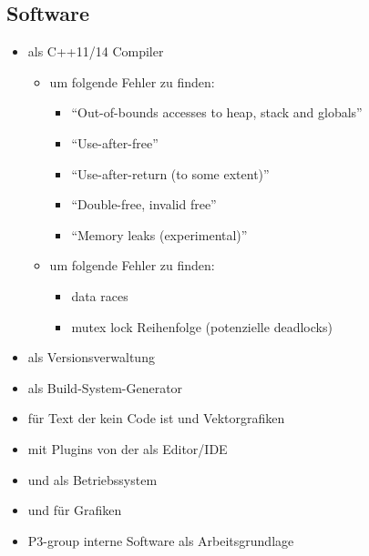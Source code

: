   \subsection{Software}
  \label{ssec:software}
    \begin{itemize}
      \item {} als C++11/14 Compiler
        \begin{itemize}
          \item {} um folgende Fehler zu finden:
            \begin{itemize}
              \item ``Out-of-bounds accesses to heap, stack and globals''
              \item ``Use-after-free''
              \item ``Use-after-return (to some extent)''
              \item ``Double-free, invalid free''
              \item ``Memory leaks (experimental)''
            \end{itemize}
          \item {} um folgende Fehler zu finden:
            \begin{itemize}
              \item data races
              \item mutex lock Reihenfolge (potenzielle deadlocks)
             \end{itemize}
        \end{itemize}
      \item {} als Versionsverwaltung
      \item {} als Build-System-Generator
      \item {} für Text der kein Code ist und Vektorgrafiken
      \item {} mit Plugins von der  als Editor/IDE
      \item {} und  als Betriebssystem
      \item {} und  für Grafiken
      \item P3-group interne Software als Arbeitsgrundlage
    \end{itemize}

